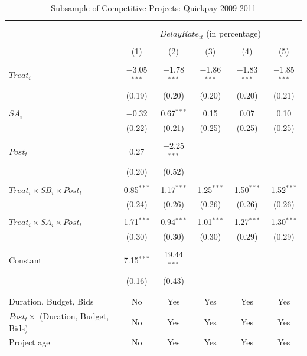 \documentclass[
]{article}
\begin{document}
\begin{table}[H] \centering 
  \caption{Subsample of Competitive Projects: Quickpay 2009-2011} 
  \label{} 
\small 
\begin{tabular}{@{\extracolsep{-2pt}}lccccc} 
\\[-1.8ex]\hline 
\hline \\[-1.8ex] 
\\[-1.8ex] & \multicolumn{5}{c}{$DelayRate_{it}$ (in percentage)} \\ 
\\[-1.8ex] & (1) & (2) & (3) & (4) & (5)\\ 
\hline \\[-1.8ex] 
 $Treat_i$ & $-$3.05$^{***}$ & $-$1.78$^{***}$ & $-$1.86$^{***}$ & $-$1.83$^{***}$ & $-$1.85$^{***}$ \\ 
  & (0.19) & (0.20) & (0.20) & (0.20) & (0.21) \\ 
  & & & & & \\ 
 $SA_i$ & $-$0.32 & 0.67$^{***}$ & 0.15 & 0.07 & 0.10 \\ 
  & (0.22) & (0.21) & (0.25) & (0.25) & (0.25) \\ 
  & & & & & \\ 
 $Post_t$ & 0.27 & $-$2.25$^{***}$ &  &  &  \\ 
  & (0.20) & (0.52) &  &  &  \\ 
  & & & & & \\ 
 $Treat_i \times SB_i \times Post_t$ & 0.85$^{***}$ & 1.17$^{***}$ & 1.25$^{***}$ & 1.50$^{***}$ & 1.52$^{***}$ \\ 
  & (0.24) & (0.26) & (0.26) & (0.26) & (0.26) \\ 
  & & & & & \\ 
 $Treat_i \times SA_i \times Post_t$ & 1.71$^{***}$ & 0.94$^{***}$ & 1.01$^{***}$ & 1.27$^{***}$ & 1.30$^{***}$ \\ 
  & (0.30) & (0.30) & (0.30) & (0.29) & (0.29) \\ 
  & & & & & \\ 
 Constant & 7.15$^{***}$ & 19.44$^{***}$ &  &  &  \\ 
  & (0.16) & (0.43) &  &  &  \\ 
  & & & & & \\ 
\hline \\[-1.8ex] 
Duration, Budget, Bids & No & Yes & Yes & Yes & Yes \\ 
$Post_t \times $  (Duration, Budget, Bids) & No & Yes & Yes & Yes & Yes \\ 
Project age & No & Yes & Yes & Yes & Yes \\ 

\end{tabular}
\end{table}
\end{document}

